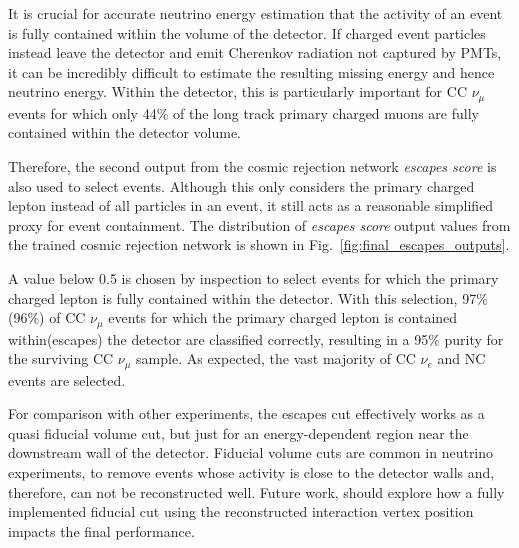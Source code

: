 It is crucial for accurate neutrino energy estimation that the activity of an event is fully
contained within the volume of the detector. If charged event particles instead leave the detector
and emit Cherenkov radiation not captured by PMTs, it can be incredibly difficult to estimate the
resulting missing energy and hence neutrino energy. Within the \chipsfive detector, this is
particularly important for CC $\nu_{\mu}$ events for which only 44\% of the long track primary
charged muons are fully contained within the detector volume.

Therefore, the second output from the cosmic rejection network \emph{escapes score} is also used
to select events. Although this only considers the primary charged lepton instead of all particles
in an event, it still acts as a reasonable simplified proxy for event containment. The
distribution of \emph{escapes score} output values from the trained cosmic rejection network is
shown in Fig.~\ref{fig:final_escapes_outputs}.

A value below 0.5 is chosen by inspection to select events for which the primary charged lepton is
fully contained within the detector. With this selection, 97\%(96\%) of CC $\nu_{\mu}$ events for
which the primary charged lepton is contained within(escapes) the detector are classified
correctly, resulting in a 95\% purity for the surviving CC $\nu_{\mu}$ sample. As expected, the
vast majority of CC $\nu_{e}$ and NC events are selected.

For comparison with other experiments, the escapes cut effectively works as a quasi fiducial
volume cut, but just for an energy-dependent region near the downstream wall of the detector.
Fiducial volume cuts are common in neutrino experiments, to remove events whose activity is close
to the detector walls and, therefore, can not be reconstructed well. Future work, should explore
how a fully implemented fiducial cut using the reconstructed interaction vertex position impacts
the final performance.

